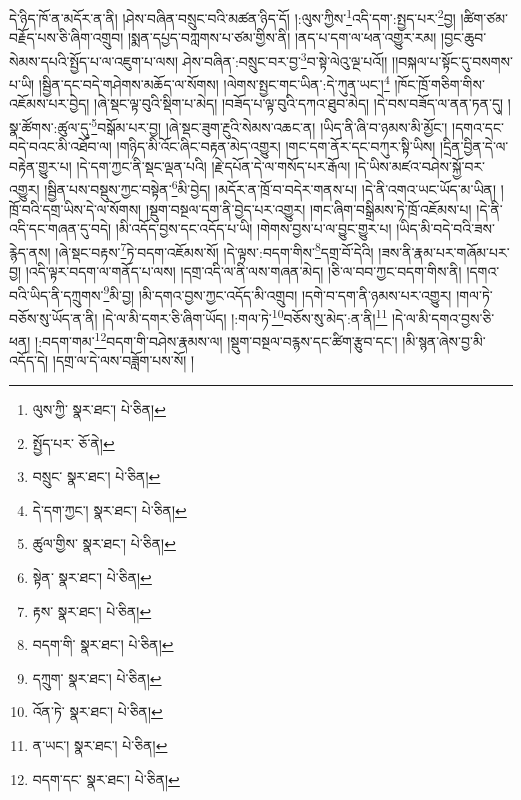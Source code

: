 དེ་ཉིད་ཁོ་ན་མདོར་ན་ནི། །ཤེས་བཞིན་བསྲུང་བའི་མཚན་ཉིད་དོ། །:ལུས་ཀྱིས་\footnote{ལུས་ཀྱི་  སྣར་ཐང་།  པེ་ཅིན། }འདི་དག་:སྤྱད་པར་\footnote{སྤྱོད་པར་  ཅོ་ནེ། }བྱ། །ཚིག་ཙམ་བརྗོད་པས་ཅི་ཞིག་འགྲུབ། །སྨན་དཔྱད་བཀླགས་པ་ཙམ་གྱིས་ནི། །ནད་པ་དག་ལ་ཕན་འགྱུར་རམ། །བྱང་ཆུབ་སེམས་དཔའི་སྤྱོད་པ་ལ་འཇུག་པ་ལས། ཤེས་བཞིན་:བསྲུང་བར་བྱ་\footnote{བསྲུང་  སྣར་ཐང་།  པེ་ཅིན། }བ་སྟེ་ལེའུ་ལྔ་པའོ།། །།བསྐལ་པ་སྟོང་དུ་བསགས་པ་ཡི། །སྦྱིན་དང་བདེ་གཤེགས་མཆོད་ལ་སོགས། །ལེགས་སྤྱང་གང་ཡིན་:དེ་ཀུན་ཡང་།\footnote{དེ་དག་ཀྱང་།  སྣར་ཐང་།  པེ་ཅིན། } །ཁོང་ཁྲོ་གཅིག་གིས་འཇོམས་པར་བྱེད། །ཞེ་སྡང་ལྟ་བུའི་སྡིག་པ་མེད། །བཟོད་པ་ལྟ་བུའི་དཀའ་ཐུབ་མེད། །དེ་བས་བཟོད་ལ་ནན་ཏན་དུ། །སྣ་ཚོགས་:ཚུལ་དུ་\footnote{ཚུལ་གྱིས་  སྣར་ཐང་།  པེ་ཅིན། }བསྒོམ་པར་བྱ། །ཞེ་སྡང་ཟུག་རྔུའི་སེམས་འཆང་ན། །ཡིད་ནི་ཞི་བ་ཉམས་མི་མྱོང་། །དགའ་དང་བདེ་བའང་མི་འཐོབ་ལ། །གཉིད་མི་འོང་ཞིང་བརྟན་མེད་འགྱུར། །གང་དག་ནོར་དང་བཀུར་སྟི་ཡིས། །དྲིན་བྱིན་དེ་ལ་བརྟེན་གྱུར་པ། །དེ་དག་ཀྱང་ནི་སྡང་ལྡན་པའི། །རྗེ་དཔོན་དེ་ལ་གསོད་པར་རྒོལ། །དེ་ཡིས་མཛའ་བཤེས་སྐྱོ་བར་འགྱུར། །སྦྱིན་པས་བསྡུས་ཀྱང་བསྟེན་\footnote{སྟེན་  སྣར་ཐང་།  པེ་ཅིན། }མི་བྱེད། །མདོར་ན་ཁྲོ་བ་བདེར་གནས་པ། །དེ་ནི་འགའ་ཡང་ཡོད་མ་ཡིན། །ཁྲོ་བའི་དགྲ་ཡིས་དེ་ལ་སོགས། །སྡུག་བསྔལ་དག་ནི་བྱེད་པར་འགྱུར། །གང་ཞིག་བསྒྲིམས་ཏེ་ཁྲོ་འཇོམས་པ། །དེ་ནི་འདི་དང་གཞན་དུ་བདེ། །མི་འདོད་བྱས་དང་འདོད་པ་ཡི། །གེགས་བྱས་པ་ལ་བྱུང་གྱུར་པ། །ཡིད་མི་བདེ་བའི་ཟས་རྙེད་ནས། །ཞེ་སྡང་བརྟས་\footnote{རྟས་  སྣར་ཐང་།  པེ་ཅིན། }ཏེ་བདག་འཇོམས་སོ། །དེ་ལྟས་:བདག་གིས་\footnote{བདག་གི་  སྣར་ཐང་།  པེ་ཅིན། }དགྲ་བོ་དེའི། །ཟས་ནི་རྣམ་པར་གཞོམ་པར་བྱ། །འདི་ལྟར་བདག་ལ་གནོད་པ་ལས། །དགྲ་འདི་ལ་ནི་ལས་གཞན་མེད། །ཅི་ལ་བབ་ཀྱང་བདག་གིས་ནི། །དགའ་བའི་ཡིད་ནི་དཀྲུགས་\footnote{དཀྲུག་  སྣར་ཐང་།  པེ་ཅིན། }མི་བྱ། །མི་དགའ་བྱས་ཀྱང་འདོད་མི་འགྲུབ། །དགེ་བ་དག་ནི་ཉམས་པར་འགྱུར། །གལ་ཏེ་བཅོས་སུ་ཡོད་ན་ནི། །དེ་ལ་མི་དགར་ཅི་ཞིག་ཡོད། །:གལ་ཏེ་\footnote{འོན་ཏེ་  སྣར་ཐང་།  པེ་ཅིན། }བཅོས་སུ་མེད་:ན་ནི།\footnote{ན་ཡང་།  སྣར་ཐང་།  པེ་ཅིན། } །དེ་ལ་མི་དགའ་བྱས་ཅི་ཕན། །:བདག་གམ་\footnote{བདག་དང་  སྣར་ཐང་།  པེ་ཅིན། }བདག་གི་བཤེས་རྣམས་ལ། །སྡུག་བསྔལ་བརྙས་དང་ཚིག་རྩུབ་དང་། །མི་སྙན་ཞེས་བྱ་མི་འདོད་དེ། །དགྲ་ལ་དེ་ལས་བཟློག་པས་སོ། །
